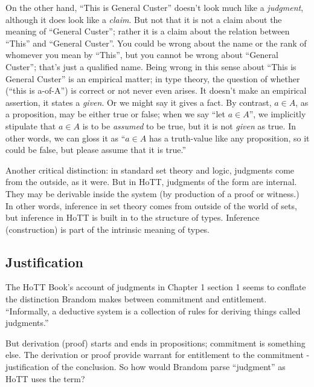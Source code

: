 On the other hand, ``This is General Custer'' doesn't look much like a
\textit{judgment}, although it does look like a \textit{claim}.  But
not that it is not a claim about the meaning of ``General Custer'';
rather it is a claim about the relation between ``This'' and ``General
Custer''.  You could be wrong about the name or the rank of whomever
you mean by ``This'', but you cannot be wrong about ``General
Custer''; that's just a qualified name.  Being wrong in this sense
about ``This is General Custer'' is an empirical matter; in type
theory, the question of whether \atypeA (``this is a-of-A'') is
correct or not never even arises.  It doesn't make an empirical
assertion, it states a \textit{given}.  Or we might say it gives a
fact.  By contrast, \(a\in A\), as a proposition, may be either true
or false; when we say ``let \(a\in A\)'', we implicitly stipulate that
\(a\in A\) is to be \textit{assumed} to be true, but it is not
\textit{given} as true.  In other words, we can gloss it as ``\(a\in
A\) has a truth-value like any proposition, so it could be false, but
please assume that it is true.''

Another critical distinction: in standard set theory and logic,
judgments come from the outside, as it were.  But in HoTT, judgments
of the form \atypeA are internal.  They may be derivable inside the
system (by production of a proof or witness.)  In other words,
inference in set theory comes from outside of the world of sets, but
inference in HoTT is built in to the structure of types.  Inference
(construction) is part of the intrinsic meaning of types.

\subsection{Justification}
\label{subs:just}

The HoTT Book's account of judgments in Chapter 1 section 1 seems to
conflate the distinction Brandom makes between commitment and
entitlement.  ``Informally, a deductive system is a collection of
rules for deriving things called judgments.''

But derivation (proof) starts and ends in propositions; commitment is
something else.  The derivation or proof provide warrant for
entitlement to the commitment - justification of the conclusion.  So
how would Brandom parse ``judgment'' as HoTT uses the term?

